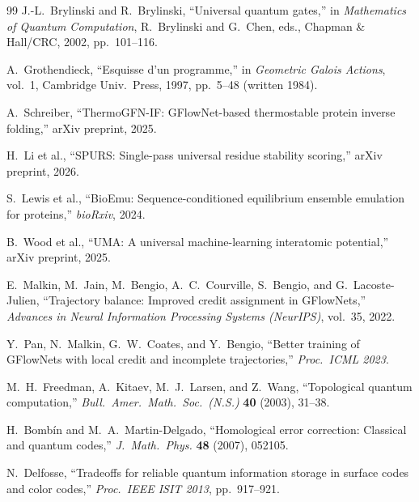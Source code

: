 \documentclass[11pt,oneside]{amsbook}
\numberwithin{equation}{section}
\theoremstyle{plain}
\theoremstyle{definition}
\theoremstyle{remark}
\begin{document}
\begin{thebibliography}{99}
J.-L.~Brylinski and R.~Brylinski,
\newblock ``Universal quantum gates,''
\newblock in \emph{Mathematics of Quantum Computation}, R.~Brylinski
and G.~Chen, eds., Chapman \& Hall/CRC, 2002, pp.~101--116.

A.~Grothendieck,
\newblock ``Esquisse d'un programme,''
\newblock in \emph{Geometric Galois Actions}, vol.~1, Cambridge Univ.\ Press,
1997, pp.~5--48 (written 1984).


A.~Schreiber,
\newblock ``ThermoGFN-IF: GFlowNet-based thermostable protein inverse folding,''
\newblock arXiv preprint, 2025.

H.~Li et al.,
\newblock ``SPURS: Single-pass universal residue stability scoring,''
\newblock arXiv preprint, 2026.

S.~Lewis et al.,
\newblock ``BioEmu: Sequence-conditioned equilibrium ensemble emulation for proteins,''
\newblock \emph{bioRxiv}, 2024.

B.~Wood et al.,
\newblock ``UMA: A universal machine-learning interatomic potential,''
\newblock arXiv preprint, 2025.

E.~Malkin, M.~Jain, M.~Bengio, A.~C.~Courville, S.~Bengio, and G.~Lacoste-Julien,
\newblock ``Trajectory balance: Improved credit assignment in GFlowNets,''
\newblock \emph{Advances in Neural Information Processing Systems (NeurIPS)}, vol.~35, 2022.

Y.~Pan, N.~Malkin, G.~W.~Coates, and Y.~Bengio,
\newblock ``Better training of GFlowNets with local credit and incomplete trajectories,''
\newblock \emph{Proc.\ ICML 2023}.

M.~H.~Freedman, A.~Kitaev, M.~J.~Larsen, and Z.~Wang,
\newblock ``Topological quantum computation,''
\newblock \emph{Bull.\ Amer.\ Math.\ Soc.\ (N.S.)} \textbf{40} (2003), 31--38.

H.~Bomb\'in and M.~A.~Martin-Delgado,
\newblock ``Homological error correction: Classical and quantum codes,''
\newblock \emph{J.\ Math.\ Phys.} \textbf{48} (2007), 052105.

N.~Delfosse,
\newblock ``Tradeoffs for reliable quantum information storage in surface codes and color codes,''
\newblock \emph{Proc.\ IEEE ISIT 2013}, pp.~917--921.


\end{thebibliography}
\end{document}
